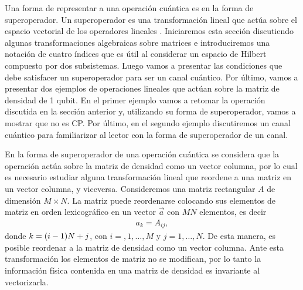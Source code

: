 Una forma de representar a una operación cuántica es en la forma de 
superoperador. Un superoperador es una transformación lineal
que actúa sobre el espacio vectorial de los operadores lineales 
\cite{preskill1998lecture}. Iniciaremos esta sección discutiendo algunas
transformaciones algebraicas sobre matrices e introduciremos 
una notación de cuatro índices que es útil al considerar un espacio de Hilbert 
compuesto por dos subsistemas. Luego vamos a presentar 
las condiciones que debe satisfacer un superoperador para ser un 
canal cuántico. Por último, vamos a presentar dos ejemplos de operaciones
lineales que actúan sobre la matriz de densidad de 1 qubit. En el primer 
ejemplo vamos a retomar la operación discutida en la sección anterior y, 
utilizando su forma de superoperador, vamos a mostrar que no es CP. 
Por último, en el segundo ejemplo discutiremos un canal cuántico
para familiarizar al lector con la forma de superoperador de un canal.

En la forma de superoperador de una operación cuántica se 
considera que la operación actúa sobre la matriz de densidad 
como un vector columna, por lo cual es necesario estudiar alguna transformación
lineal que reordene a una matriz en un vector columna, y viceversa.
Consideremos una matriz rectangular $A$ de dimensión $M\times N$.
La matriz puede reordenarse colocando sus elementos de matriz en 
orden lexicográfico en un vector $\vec{a}$ con $MN$ elementos, es decir
\begin{align}
a_k=A_{ij}, 
\label{eq:matrix-to-vector}
\end{align}
donde $k=\qty(i-1)N+j$, con $i=,1,\ldots,M$ y $j=1,\ldots,N$. De
esta manera, es posible reordenar a la matriz de densidad como un 
vector columna. Ante esta transformación los elementos de matriz no se 
modifican, por lo tanto la información física contenida en una matriz 
de densidad es invariante al vectorizarla.

